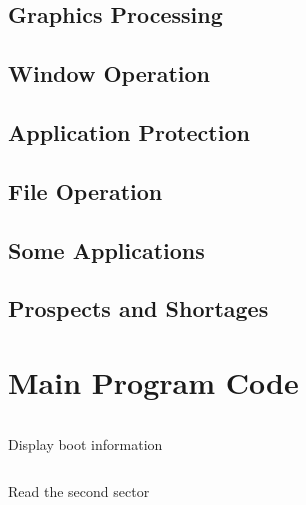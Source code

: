 \documentclass{swfcthesisp}
\begin{document}
\section{Graphics Processing}

\section{Window Operation}

\section{Application Protection}

\section{File Operation}

\section{Some Applications}

\section{Prospects and Shortages}


\Appendix{}
\printbibliography[heading={bibintoc},title={参考文献}] %
\advisorinfopage{}                 %
\acknowledgmentspage{}             %


\chapter{Main Program Code} %
\begin{listing}[H]
  \inputminted[firstline=55, lastline=65,
  linenos=true]{nasm}{../../src/06day/RongC/ipl10.nas}
  
  \caption{Display boot information}
  \label{lst:dis-boo-inf}

\end{listing}

\begin{listing}[H]
  \inputminted[firstline=87,lastline=106,linenos=true]{nasm}{../../src/06day/RongC/ipl10.nas}
  \caption{Read the second sector}
  \label{lst:rea-sec-sec}
\end{listing}
\end{document}
